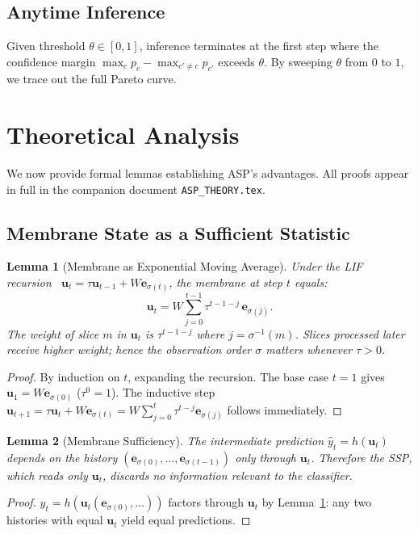 \documentclass[11pt,a4paper]{article}
\newtheorem{lemma}{Lemma}[section]
\begin{document}
\subsection{Anytime Inference}

Given threshold $\theta \in [0,1]$, inference terminates at the first step
where the confidence margin $\max_c p_c - \max_{c'\neq c} p_{c'}$ exceeds
$\theta$. By sweeping $\theta$ from $0$ to $1$, we trace out the full
Pareto curve.

\section{Theoretical Analysis}

We now provide formal lemmas establishing ASP's advantages.
All proofs appear in full in the companion document \texttt{ASP\_THEORY.tex}.

\subsection{Membrane State as a Sufficient Statistic}

\begin{lemma}[Membrane as Exponential Moving Average]
\label{lem:ema}
Under the LIF recursion~\cite{fang2021plif} $\mathbf{u}_t = \tau \mathbf{u}_{t-1} + W\mathbf{e}_{\sigma(t)}$,
the membrane at step $t$ equals:
\[
  \mathbf{u}_t = W \sum_{j=0}^{t-1} \tau^{t-1-j}\, \mathbf{e}_{\sigma(j)}.
\]
The weight of slice $m$ in $\mathbf{u}_t$ is $\tau^{t-1-j}$ where $j=\sigma^{-1}(m)$.
Slices processed \emph{later} receive \emph{higher} weight; hence the observation
order $\sigma$ matters whenever $\tau > 0$.
\end{lemma}

\begin{proof}
By induction on $t$, expanding the recursion.  The base case $t=1$ gives
$\mathbf{u}_1 = W\mathbf{e}_{\sigma(0)}$ ($\tau^0=1$).  The inductive step
$\mathbf{u}_{t+1} = \tau \mathbf{u}_t + W\mathbf{e}_{\sigma(t)} =
W\sum_{j=0}^{t}\tau^{t-j}\mathbf{e}_{\sigma(j)}$ follows immediately.
\end{proof}

\begin{lemma}[Membrane Sufficiency]
\label{lem:suff}
The intermediate prediction $\hat{y}_t = h(\mathbf{u}_t)$ depends on the
history $(\mathbf{e}_{\sigma(0)},\ldots,\mathbf{e}_{\sigma(t-1)})$ only through
$\mathbf{u}_t$.  Therefore the SSP, which reads only $\mathbf{u}_t$, discards
no information relevant to the classifier.
\end{lemma}
\begin{proof}
$\hat{y}_t = h(\mathbf{u}_t(\mathbf{e}_{\sigma(0)},\ldots))$ factors through $\mathbf{u}_t$
by Lemma~\ref{lem:ema}: any two histories with equal $\mathbf{u}_t$ yield equal predictions.
\end{proof}
\end{document}

